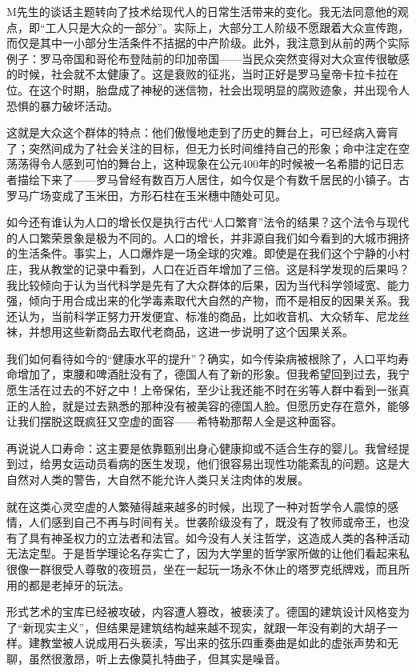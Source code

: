 \documentclass[UTF8]{ctexart}
\begin{document}
M先生的谈话主题转向了技术给现代人的日常生活带来的变化。我无法同意他的观点，即“工人只是大众的一部分”。实际上，大部分工人阶级不愿跟着大众宣传跑，而仅是其中一小部分生活条件不拮据的中产阶级。此外，我注意到从前的两个实际例子：罗马帝国和哥伦布登陆前的印加帝国——当民众突然变得对大众宣传很敏感的时候，社会就不太健康了。这是衰败的征兆，当时正好是罗马皇帝卡拉卡拉在位。在这个时期，胎盘成了神秘的迷信物，社会出现明显的腐败迹象，并出现令人恐惧的暴力破坏活动。

这就是大众这个群体的特点：他们傲慢地走到了历史的舞台上，可已经病入膏肓了；突然间成为了社会关注的目标，但无力长时间维持自己的形象；命中注定在空荡荡得令人感到可怕的舞台上，这种现象在公元400年的时候被一名希腊的记日志者描绘下来了——罗马曾经有数百万人居住，如今仅是个有数千居民的小镇子。古罗马广场变成了玉米田，方形石柱在玉米穗中随处可见。

如今还有谁认为人口的增长仅是执行古代“人口繁育”法令的结果？这个法令与现代的人口繁荣景象是极为不同的。人口的增长，并非源自我们如今看到的大城市拥挤的生活条件。事实上，人口爆炸是一场全球的灾难。即使是在我们这个宁静的小村庄，我从教堂的记录中看到，人口在近百年增加了三倍。这是科学发现的后果吗？我比较倾向于认为当代科学是先有了大众群体的后果，因为当代科学领域宽、能力强，倾向于用合成出来的化学毒素取代大自然的产物，而不是相反的因果关系。我还认为，当前科学正努力开发便宜、标准的商品，比如收音机、大众轿车、尼龙丝袜，并想用这些新商品去取代老商品，这进一步说明了这个因果关系。

我们如何看待如今的“健康水平的提升”？确实，如今传染病被根除了，人口平均寿命增加了，束腰和啤酒肚没有了，德国人有了新的形象。但我希望回到过去，我宁愿生活在过去的不好之中！上帝保佑，至少让我还能不时在劣等人群中看到一张真正的人脸，就是过去熟悉的那种没有被美容的德国人脸。但愿历史存在意外，能够让我们摆脱这既疯狂又空虚的面容——希特勒那帮人全是这种面容。

再说说人口寿命：这主要是依靠甄别出身心健康抑或不适合生存的婴儿。我曾经提到过，给男女运动员看病的医生发现，他们很容易出现性功能紊乱的问题。这是大自然对人类的警告，大自然不能允许人类只关注肉体的发展。

就在这类心灵空虚的人繁殖得越来越多的时候，出现了一种对哲学令人震惊的感情，人们感到自己不再与时间有关。世袭阶级没有了，既没有了牧师或帝王，也没有了具有神圣权力的立法者和法官。如今没有人关注哲学，这造成人类的各种活动无法定型。于是哲学理论名存实亡了，因为大学里的哲学家所做的让他们看起来私很像一群很受人尊敬的夜班员，坐在一起玩一场永不休止的塔罗克纸牌戏，而且所用的都是老掉牙的玩法。

形式艺术的宝库已经被攻破，内容遭人篡改，被亵渎了。德国的建筑设计风格变为了“新现实主义”，但结果是建筑结构越来越不现实，就跟一年没有剃的大胡子一样。建教堂被人说成用石头亵渎，写出来的弦乐四重奏曲是如此的虚张声势和无聊，虽然很激昂，听上去像莫扎特曲子，但其实是噪音。
\end{document}
